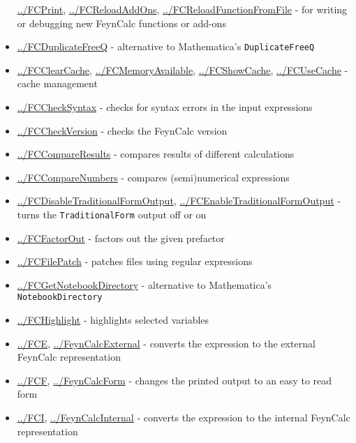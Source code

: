 \documentclass[../FeynCalcManual.tex]{subfiles}
\begin{document}
\begin{itemize}
  \hyperlink{../fcprint}{../FCPrint},
  \hyperlink{../fcreloadaddons}{../FCReloadAddOns},
  \hyperlink{../fcreloadfunctionfromfile}{../FCReloadFunctionFromFile} -
  for writing or debugging new FeynCalc functions or add-ons
\item
  \hyperlink{../fcduplicatefreeq}{../FCDuplicateFreeQ} - alternative to
  Mathematica's \texttt{DuplicateFreeQ}
\item
  \hyperlink{../fcclearcache}{../FCClearCache},
  \hyperlink{../fcmemoryavailable}{../FCMemoryAvailable},
  \hyperlink{../fcshowcache}{../FCShowCache},
  \hyperlink{../fcusecache}{../FCUseCache} - cache management
\item
  \hyperlink{../fcchecksyntax}{../FCCheckSyntax} - checks for syntax
  errors in the input expressions
\item
  \hyperlink{../fccheckversion}{../FCCheckVersion} - checks the FeynCalc
  version
\item
  \hyperlink{../fccompareresults}{../FCCompareResults} - compares
  results of different calculations
\item
  \hyperlink{../fccomparenumbers}{../FCCompareNumbers} - compares
  (semi)numerical expressions
\item
  \hyperlink{../fcdisabletraditionalformoutput}{../FCDisableTraditionalFormOutput},
  \hyperlink{../fcenabletraditionalformoutput}{../FCEnableTraditionalFormOutput}
  - turns the \texttt{TraditionalForm} output off or on
\item
  \hyperlink{../fcfactorout}{../FCFactorOut} - factors out the given
  prefactor
\item
  \hyperlink{../fcfilepatch}{../FCFilePatch} - patches files using
  regular expressions
\item
  \hyperlink{../fcgetnotebookdirectory}{../FCGetNotebookDirectory} -
  alternative to Mathematica's \texttt{NotebookDirectory}
\item
  \hyperlink{../fchighlight}{../FCHighlight} - highlights selected
  variables
\item
  \hyperlink{../fce}{../FCE},
  \hyperlink{../feyncalcexternal}{../FeynCalcExternal} - converts the
  expression to the external FeynCalc representation
\item
  \hyperlink{../fcf}{../FCF},
  \hyperlink{../feyncalcform}{../FeynCalcForm} - changes the printed
  output to an easy to read form
\item
  \hyperlink{../fci}{../FCI},
  \hyperlink{../feyncalcinternal}{../FeynCalcInternal} - converts the
  expression to the internal FeynCalc representation

\end{itemize}
\end{document}
